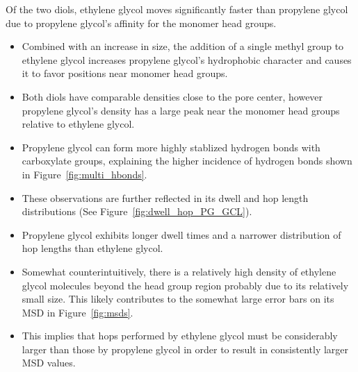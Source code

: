 \documentclass{article}
\begin{document}
  Of the two diols, ethylene glycol moves significantly faster than propylene glycol
  due to propylene glycol's affinity for the monomer head groups.  
  \begin{itemize}
    \item Combined with an increase in size, the addition of a single methyl group to ethylene glycol
    increases propylene glycol's hydrophobic character and causes it to favor positions
    near monomer head groups.
    \item Both diols have comparable densities close to the pore center, however propylene glycol's
    density has a large peak near the monomer head groups relative to ethylene glycol.
    \item Propylene glycol can form more highly stablized hydrogen bonds with carboxylate groups,
    explaining the higher incidence of hydrogen bonds shown in Figure~\ref{fig:multi_hbonds}.
    \item These observations are further reflected in its dwell and hop length distributions
    (See Figure~\ref{fig:dwell_hop_PG_GCL}).
    \item Propylene glycol exhibits longer dwell times and a narrower distribution of 
    hop lengths than ethylene glycol. 
    \item Somewhat counterintuitively, there is a relatively high density of ethylene
    glycol molecules beyond the head group region probably due to its relatively small size.
    This likely contributes to the somewhat large error bars on its MSD in Figure~\ref{fig:msds}. 
    \item This implies that hops performed by ethylene glycol must be considerably larger
    than those by propylene glycol in order to result in consistently larger MSD values.
  \end{itemize}
  
  
\end{document}

